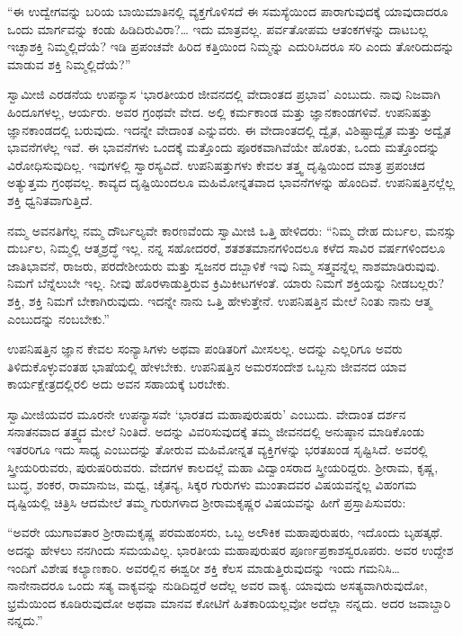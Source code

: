  “ಈ ಉದ್ವೇಗವನ್ನು ಬರಿಯ ಬಾಯಿಮಾತಿನಲ್ಲಿ ವ್ಯಕ್ತಗೊಳಿಸದೆ ಈ ಸಮಸ್ಯೆಯಿಂದ ಪಾರಾಗುವುದಕ್ಕೆ ಯಾವುದಾದರೂ ಒಂದು ಮಾರ್ಗವನ್ನು ಕಂಡು ಹಿಡಿದಿರುವಿರಾ?… ಇದು ಮಾತ್ರವಲ್ಲ. ಪರ್ವತೋಪಮ ಆತಂಕಗಳನ್ನು ದಾಟಬಲ್ಲ ಇಚ್ಛಾಶಕ್ತಿ ನಿಮ್ಮಲ್ಲಿದೆಯೆ? ಇಡಿ ಪ್ರಪಂಚವೇ ಹಿರಿದ ಕತ್ತಿಯಿಂದ ನಿಮ್ಮನ್ನು ಎದುರಿಸಿದರೂ ಸರಿ ಎಂದು ತೋರಿದುದನ್ನು ಮಾಡುವ ಶಕ್ತಿ ನಿಮ್ಮಲ್ಲಿದೆಯೆ?” 

 ಸ್ವಾಮೀಜಿ ಎರಡನೆಯ ಉಪನ್ಯಾಸ ‘ಭಾರತೀಯರ ಜೀವನದಲ್ಲಿ ವೇದಾಂತದ ಪ್ರಭಾವ’ ಎಂಬುದು. ನಾವು ನಿಜವಾಗಿ ಹಿಂದೂಗಳಲ್ಲ, ಆರ್ಯರು. ಅವರ ಗ್ರಂಥವೇ ವೇದ. ಅಲ್ಲಿ ಕರ್ಮಕಾಂಡ ಮತ್ತು ಜ್ಞಾನಕಾಂಡಗಳಿವೆ. ಉಪನಿಷತ್ತು ಜ್ಞಾನಕಾಂಡದಲ್ಲಿ ಬರುವುದು. ಇದನ್ನೇ ವೇದಾಂತ ಎನ್ನುವರು. ಈ ವೇದಾಂತದಲ್ಲಿ ದ್ವೈತ, ವಿಶಿಷ್ಟಾದ್ವೈತ ಮತ್ತು ಅದ್ವೈತ ಭಾವನೆಗಳೆಲ್ಲ ಇವೆ. ಈ ಭಾವನೆಗಳು ಒಂದಕ್ಕೆ ಮತ್ತೊಂದು ಪೂರಕವಾಗಿವೆಯೇ ಹೊರತು, ಒಂದು ಮತ್ತೊಂದನ್ನು ವಿರೋಧಿಸುವುದಿಲ್ಲ. ಇವುಗಳಲ್ಲಿ ಸ್ವಾರಸ್ಯವಿದೆ. ಉಪನಿಷತ್ತುಗಳು ಕೇವಲ ತತ್ತ್ವ ದೃಷ್ಟಿಯಿಂದ ಮಾತ್ರ ಪ್ರಪಂಚದ ಅತ್ಯುತ್ತಮ ಗ್ರಂಥವಲ್ಲ. ಕಾವ್ಯದ ದೃಷ್ಟಿಯಿಂದಲೂ ಮಹಿಮೋನ್ನತವಾದ ಭಾವನೆಗಳನ್ನು ಹೊಂದಿವೆ. ಉಪನಿಷತ್ತಿನಲ್ಲೆಲ್ಲ ಶಕ್ತಿ ಧ್ವನಿತವಾಗುತ್ತಿದೆ. 

 ನಮ್ಮ ಅವನತಿಗೆಲ್ಲ ನಮ್ಮ ದೌರ್ಬಲ್ಯವೇ ಕಾರಣವೆಂದು ಸ್ವಾಮೀಜಿ ಒತ್ತಿ ಹೇಳಿದರು: “ನಿಮ್ಮ ದೇಹ ದುರ್ಬಲ, ಮನಸ್ಸು ದುರ್ಬಲ, ನಿಮ್ಮಲ್ಲಿ ಆತ್ಮಶ್ರದ್ಧೆ ಇಲ್ಲ. ನನ್ನ ಸಹೋದರರೆ, ಶತಶತಮಾನಗಳಿಂದಲೂ ಕಳೆದ ಸಾವಿರ ವರ್ಷಗಳಿಂದಲೂ ಜಾತಿಭಾವನೆ, ರಾಜರು, ಪರದೇಶೀಯರು ಮತ್ತು ಸ್ವಜನರ ದಬ್ಬಾಳಿಕೆ ಇವು ನಿಮ್ಮ ಸತ್ತ್ವವನ್ನೆಲ್ಲ ನಾಶಮಾಡಿರುವುವು. ನಿಮಗೆ ಬೆನ್ನೆಲುಬೇ ಇಲ್ಲ. ನೀವು ಹೊರಳಾಡುತ್ತಿರುವ ಕ್ರಿಮಿಕೀಟಗಳಂತೆ. ಯಾರು ನಿಮಗೆ ಶಕ್ತಿಯನ್ನು ನೀಡಬಲ್ಲರು? ಶಕ್ತಿ, ಶಕ್ತಿ ನಿಮಗೆ ಬೇಕಾಗಿರುವುದು. ಇದನ್ನೇ ನಾನು ಒತ್ತಿ ಹೇಳುತ್ತೇನೆ. ಉಪನಿಷತ್ತಿನ ಮೇಲೆ ನಿಂತು ನಾನು ಆತ್ಮ ಎಂಬುದನ್ನು ನಂಬಬೇಕು.” 

 ಉಪನಿಷತ್ತಿನ ಜ್ಞಾನ ಕೇವಲ ಸಂನ್ಯಾಸಿಗಳು ಅಥವಾ ಪಂಡಿತರಿಗೆ ಮೀಸಲಲ್ಲ. ಅದನ್ನು ಎಲ್ಲರಿಗೂ ಅವರು ತಿಳಿದುಕೊಳ್ಳುವಂತಹ ಭಾಷೆಯಲ್ಲಿ ಹೇಳಬೇಕು. ಉಪನಿಷತ್ತಿನ ಅಮರಸಂದೇಶ ಒಬ್ಬನು ಜೀವನದ ಯಾವ ಕಾರ್ಯಕ್ಷೇತ್ರದಲ್ಲಿರಲಿ ಅದು ಅವನ ಸಹಾಯಕ್ಕೆ ಬರಬೇಕು. 

 ಸ್ವಾಮೀಜಿಯವರ ಮೂರನೇ ಉಪನ್ಯಾಸವೇ ‘ಭಾರತದ ಮಹಾಪುರುಷರು’ ಎಂಬುದು. ವೇದಾಂತ ದರ್ಶನ ಸನಾತನವಾದ ತತ್ತ್ವದ ಮೇಲೆ ನಿಂತಿದೆ. ಅದನ್ನು ವಿವರಿಸುವುದಕ್ಕೆ ತಮ್ಮ ಜೀವನದಲ್ಲಿ ಅನುಷ್ಠಾನ ಮಾಡಿಕೊಂಡು ಇತರರಿಗೂ ಇದು ಸಾಧ್ಯ ಎಂಬುದನ್ನು ತೋರುವ ಮಹಿಮೋನ್ನತ ವ್ಯಕ್ತಿಗಳನ್ನು ಭರತಖಂಡ ಸೃಷ್ಟಿಸಿದೆ. ಅವರಲ್ಲಿ ಸ್ತ್ರೀಯರಿರುವರು, ಪುರುಷರಿರುವರು. ವೇದಗಳ ಕಾಲದಲ್ಲೆ ಮಹಾ ವಿದ್ವಾಂಸರಾದ ಸ್ತ್ರೀಯರಿದ್ದರು. ಶ‍್ರೀರಾಮ, ಕೃಷ್ಣ, ಬುದ್ಧ, ಶಂಕರ, ರಾಮಾನುಜ, ಮಧ್ವ, ಚೈತನ್ಯ, ಸಿಕ್ಕರ ಗುರುಗಳು ಮುಂತಾದವರ ವಿಷಯವನ್ನೆಲ್ಲ ವಿಹಂಗಮ ದೃಷ್ಟಿಯಲ್ಲಿ ಚಿತ್ರಿಸಿ ಆದಮೇಲೆ ತಮ್ಮ ಗುರುಗಳಾದ ಶ‍್ರೀರಾಮಕೃಷ್ಣರ ವಿಷಯವನ್ನು ಹೀಗೆ ಪ್ರಸ್ತಾಪಿಸುವರು: 

 “ಅವರೇ ಯುಗಾವತಾರ ಶ‍್ರೀರಾಮಕೃಷ್ಣ ಪರಮಹಂಸರು, ಒಬ್ಬ ಅಲೌಕಿಕ ಮಹಾಪುರುಷರು, ಇದೊಂದು ಬೃಹತ್ಕಥೆ. ಅದನ್ನು ಹೇಳಲು ನನಗಿಂದು ಸಮಯವಿಲ್ಲ. ಭಾರತೀಯ ಮಹಾಪುರುಷರ ಪೂರ್ಣಪ್ರಕಾಶಸ್ವರೂಪರು. ಅವರ ಉದ್ದೇಶ ಇಂದಿಗೆ ವಿಶೇಷ ಕಲ್ಯಾಣಕಾರಿ. ಅವರಲ್ಲಿನ ಈಶ್ವರೀ ಶಕ್ತಿ ಕೆಲಸ ಮಾಡುತ್ತಿರುವುದನ್ನು ಇಂದು ಗಮನಿಸಿ… ನಾನೇನಾದರೂ ಒಂದು ಸತ್ಯ ವಾಕ್ಯವನ್ನು ನುಡಿದಿದ್ದರೆ ಅದೆಲ್ಲ ಅವರ ವಾಕ್ಯ. ಯಾವುದು ಅಸತ್ಯವಾಗಿರುವುದೋ, ಭ್ರಮೆಯಿಂದ ಕೂಡಿರುವುದೋ ಅಥವಾ ಮಾನವ ಕೋಟಿಗೆ ಹಿತಕಾರಿಯಲ್ಲವೋ ಅದೆಲ್ಲಾ ನನ್ನದು. ಅದರ ಜವಾಬ್ದಾರಿ ನನ್ನದು.” 

